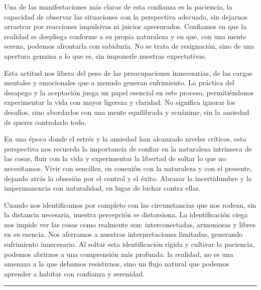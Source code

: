 \documentclass[
  a5paperpaper,
]{article}
\begin{document}
Una de las manifestaciones más claras de esta confianza es la paciencia,
la capacidad de observar las situaciones con la perspectiva adecuada,
sin dejarnos arrastrar por reacciones impulsivas ni juicios apresurados.
Confiamos en que la realidad se despliega conforme a su propia
naturaleza y en que, con una mente serena, podemos afrontarla con
sabiduría. No se trata de resignación, sino de una apertura genuina a lo
que es, sin imponerle nuestras expectativas.

Esta actitud nos libera del peso de las preocupaciones innecesarias, de
las cargas mentales y emocionales que a menudo generan sufrimiento. La
práctica del desapego y la aceptación juega un papel esencial en este
proceso, permitiéndonos experimentar la vida con mayor ligereza y
claridad. No significa ignorar los desafíos, sino abordarlos con una
mente equilibrada y ecuánime, sin la ansiedad de querer controlarlo
todo.

En una época donde el estrés y la ansiedad han alcanzado niveles
críticos, esta perspectiva nos recuerda la importancia de confiar en la
naturaleza intrínseca de las cosas, fluir con la vida y experimentar la
libertad de soltar lo que no necesitamos. Vivir con sencillez, en
conexión con la naturaleza y con el presente, dejando atrás la obsesión
por el control y el éxito. Abrazar la incertidumbre y la impermanencia
con naturalidad, en lugar de luchar contra ellas.

Cuando nos identificamos por completo con las circunstancias que nos
rodean, sin la distancia necesaria, nuestra percepción se distorsiona.
La identificación ciega nos impide ver las cosas como realmente son:
interconectadas, armoniosas y libres en su esencia. Nos aferramos a
nuestras interpretaciones limitadas, generando sufrimiento innecesario.
Al soltar esta identificación rígida y cultivar la paciencia, podemos
abrirnos a una comprensión más profunda: la realidad, no es una amenaza
a la que debamos resistirnos, sino un flujo natural que podemos aprender
a habitar con confianza y serenidad.

\hfill\break

\begin{center}\rule{0.5\linewidth}{0.5pt}\end{center}

\hfill\break
\end{document}
